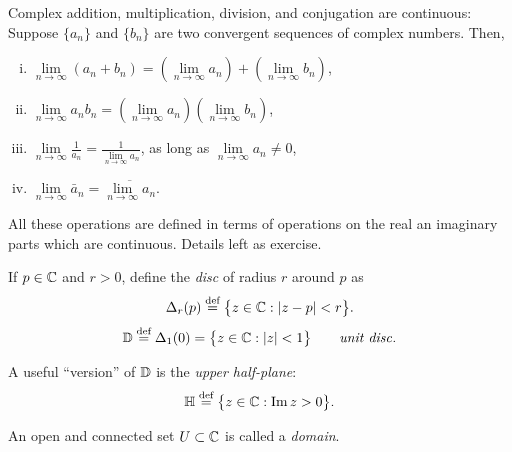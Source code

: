\documentclass[10pt,aspectratio=169]{beamer}
\begin{document}
\begin{frame}

\begin{proposition}
Complex addition, multiplication, division, and conjugation are continuous:
Suppose $\{ a_n \}$ and $\{ b_n \}$ are two convergent sequences
of complex numbers.  Then,
\begin{enumerate}[(i)]
\item
$\lim\limits_{n\to\infty} (a_n + b_n) = 
\left(\lim\limits_{n\to\infty} a_n \right) +
\left(\lim\limits_{n\to\infty} b_n \right)$,
\item
$\lim\limits_{n\to\infty} a_n b_n = 
\left(\lim\limits_{n\to\infty} a_n \right)
\left(\lim\limits_{n\to\infty} b_n \right)$,
\item
$\lim\limits_{n\to\infty} \frac{1}{a_n} = \frac{1}{\lim\limits_{n\to\infty} a_n}$,
as long as $\lim\limits_{n\to\infty} a_n \not= 0$,
\item
$\lim\limits_{n\to\infty} \bar{a}_n = 
\overline{\lim\limits_{n\to\infty} a_n}$.
\end{enumerate}
\end{proposition}

\medskip
\pause

All these operations are defined in terms of operations on the real an
imaginary parts which are continuous.  Details left as exercise.

\end{frame}

\begin{frame}

If $p \in {\mathbb{C}}$ and $r > 0$, define the \emph{disc} of radius $r$ around $p$
as
\begin{equation*}
\Delta_r(p)
\overset{\text{def}}{=}
\bigl\{ z \in {\mathbb{C}} : \lvert {z-p} \rvert < r \bigr\} .
\end{equation*}
\pause
\begin{equation*}
{\mathbb{D}}
\overset{\text{def}}{=}
\Delta_1(0)
=
\bigl\{ z \in {\mathbb{C}} : \lvert {z} \rvert < 1 \bigr\} 
\qquad \text{\emph{unit disc}}.
\end{equation*}

\medskip
\pause
A useful ``version'' of ${\mathbb{D}}$ is the \emph{upper half-plane}:
\begin{equation*}
{\mathbb{H}} 
\overset{\text{def}}{=}
\bigl\{
z \in {\mathbb{C}} : \operatorname{Im} z > 0
\bigr\} .
\end{equation*}

\medskip
\pause

\begin{definition}
An open and connected set $U \subset {\mathbb{C}}$ is called a
\emph{domain}.
\end{definition}

\end{frame}
\end{document}
